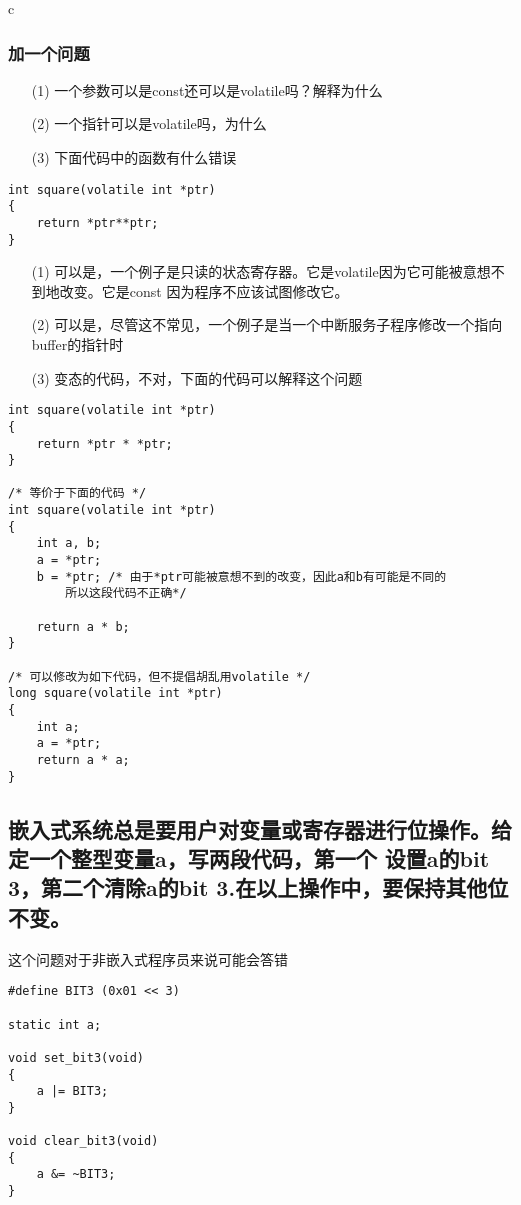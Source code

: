 \documentclass{article}
\begin{document}
\begin{mitned}{c}
\subsubsection{加一个问题}
\begin{itemize}
\item[(1)]一个参数可以是const还可以是volatile吗？解释为什么
\item[(2)]一个指针可以是volatile吗，为什么
\item[(3)]下面代码中的函数有什么错误
\end{itemize}
\begin{verbatim}
int square(volatile int *ptr)
{
	return *ptr**ptr;
}
\end{verbatim}
\begin{itemize}
\item[(1)] 可以是，一个例子是只读的状态寄存器。它是volatile因为它可能被意想不到地改变。它是const
因为程序不应该试图修改它。
\item[(2)] 可以是，尽管这不常见，一个例子是当一个中断服务子程序修改一个指向buffer的指针时
\item[(3)] 变态的代码，不对，下面的代码可以解释这个问题
\end{itemize}

\begin{verbatim}
int square(volatile int *ptr)
{
	return *ptr * *ptr;
}

/* 等价于下面的代码 */
int square(volatile int *ptr)
{
	int a, b;
	a = *ptr;
	b = *ptr; /* 由于*ptr可能被意想不到的改变，因此a和b有可能是不同的
		所以这段代码不正确*/

	return a * b;
}

/* 可以修改为如下代码，但不提倡胡乱用volatile */
long square(volatile int *ptr)
{
	int a;
	a = *ptr;
	return a * a;
}
\end{verbatim}

\subsection{嵌入式系统总是要用户对变量或寄存器进行位操作。给定一个整型变量a，写两段代码，第一个
设置a的bit 3，第二个清除a的bit 3.在以上操作中，要保持其他位不变。}
这个问题对于非嵌入式程序员来说可能会答错


\begin{verbatim}
#define BIT3 (0x01 << 3)

static int a;

void set_bit3(void)
{
	a |= BIT3;
}

void clear_bit3(void)
{
	a &= ~BIT3;
}


\end{verbatim}
\end{mitned}
\end{document}
